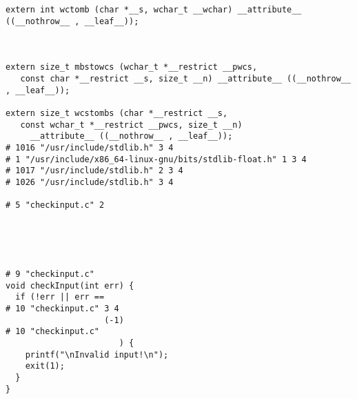\documentclass[11pt]{article}
\begin{document}
\begin{verbatim}
extern int wctomb (char *__s, wchar_t __wchar) __attribute__ ((__nothrow__ , __leaf__));



extern size_t mbstowcs (wchar_t *__restrict __pwcs,
   const char *__restrict __s, size_t __n) __attribute__ ((__nothrow__ , __leaf__));

extern size_t wcstombs (char *__restrict __s,
   const wchar_t *__restrict __pwcs, size_t __n)
     __attribute__ ((__nothrow__ , __leaf__));
# 1016 "/usr/include/stdlib.h" 3 4
# 1 "/usr/include/x86_64-linux-gnu/bits/stdlib-float.h" 1 3 4
# 1017 "/usr/include/stdlib.h" 2 3 4
# 1026 "/usr/include/stdlib.h" 3 4

# 5 "checkinput.c" 2





# 9 "checkinput.c"
void checkInput(int err) {
  if (!err || err == 
# 10 "checkinput.c" 3 4
                    (-1)
# 10 "checkinput.c"
                       ) {
    printf("\nInvalid input!\n");
    exit(1);
  }
}
\end{verbatim}
\end{document}
